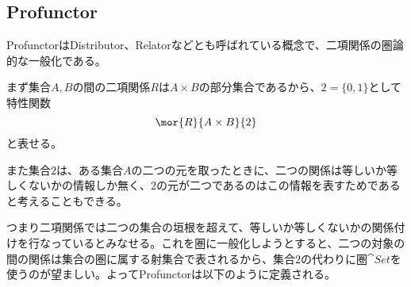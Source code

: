 \documentclass[uplatex,dvipdfmx]{jsarticle}
\begin{document}
  \subsection{Profunctor}
  ProfunctorはDistributor、Relatorなどとも呼ばれている概念で、二項関係の圏論的な一般化である。

  まず集合$A,B$の間の二項関係$R$は$A\times B$の部分集合であるから、$2 = \{0,1\}$として特性関数\[\mor{R}{A\times B}{2}\]と表せる。

  また集合$2$は、ある集合$A$の二つの元を取ったときに、二つの関係は等しいか等しくないかの情報しか無く、$2$の元が二つであるのはこの情報を表すためであると考えることもできる。

  つまり二項関係では二つの集合の垣根を超えて、等しいか等しくないかの関係付けを行なっているとみなせる。これを圏に一般化しようとすると、二つの対象の間の関係は集合の圏に属する射集合で表されるから、集合$2$の代わりに圏$\cat{Set}$を使うのが望ましい。よってProfunctorは以下のように定義される。

\end{document}
